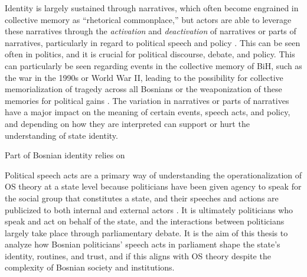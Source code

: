 Identity is largely sustained through narratives, which often become engrained in collective memory as ``rhetorical commonplace,'' but actors are able to leverage these narratives through the \textit{activation} and \textit{deactivation} of narratives or parts of narratives, particularly in regard to political speech and policy \citep[pg.~615-616]{subotic2015}. This can be seen often in politics, and it is crucial for political discourse, debate, and policy. This can particularly be seen regarding events in the collective memory of \ac{BiH}, such as the war in the 1990s or World War II, leading to the possibility for collective memorialization of tragedy across all Bosnians or the weaponization of these memories for political gains \citep{davidPolicingMemoryBosnia2019}. The variation in narratives or parts of narratives have a major impact on the meaning of certain events, speech acts, and policy, and depending on how they are interpreted can support or hurt the understanding of state identity.


Part of Bosnian identity relies on 

Political speech acts are a primary way of understanding the operationalization of \ac{OS} theory at a state level because politicians have been given agency to speak for the social group that constitutes a state, and their speeches and actions are publicized to both internal and external actors \citep[pg.~280-281]{weldes1996}. It is ultimately politicians who speak and act on behalf of the state, and the interactions between politicians largely take place through parliamentary debate. It is the aim of this thesis to analyze how Bosnian politicians' speech acts in parliament shape the state's identity, routines, and trust, and if this aligns with \ac{OS} theory despite the complexity of Bosnian society and institutions.






